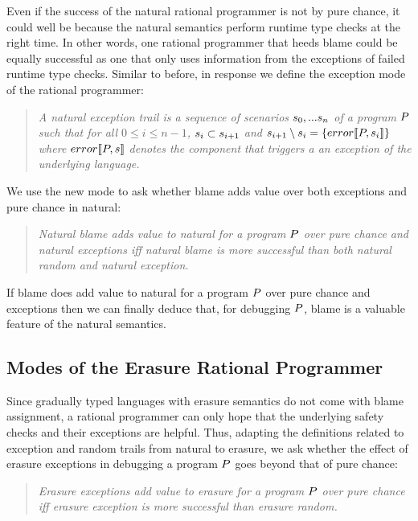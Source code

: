 Even if the success of the natural rational programmer is not by pure
chance, it could well be because the natural semantics perform runtime type checks at
the right time. In other words, one rational programmer that 
heeds blame could be equally successful as one that only uses information from the exceptions of failed 
runtime type checks. Similar to before, in response we
define the exception mode of the rational programmer:
\begin{quote}
\it 
A natural exception trail
is a sequence of scenarios $s_0,...s_n$ of a program
$P$ such that for all $0 \leq i \leq n - 1$, $s_i \subset s_{i+1}$ and
$s_{i+1} \setminus s_i = \{error\llbracket P, s_i\rrbracket\}$
  where $error\llbracket P, s\rrbracket$ denotes the component that triggers a
an exception of the underlying language.
\end{quote}
\noindent
We use the new mode to ask whether blame adds value over both exceptions and pure
chance in natural:
\begin{quote}
\it
  Natural blame adds value to natural for a program $P$ over pure chance and
  natural exceptions iff natural blame is more successful than both natural
  random and natural exception.
\end{quote}
\noindent
If blame does add value to natural for a program $P$ 
over pure chance and exceptions then we can finally
deduce that, for debugging $P$, blame is a valuable feature of the
natural semantics.



\subsection{Modes of the Erasure Rational Programmer} \label{sub:erasure}

 Since gradually typed languages with erasure semantics do not come with
 blame assignment, a rational programmer can only hope that the underlying
 safety checks and their exceptions are helpful.  Thus, adapting the
 definitions related to exception and random trails from natural to
 erasure, we ask whether the effect of erasure exceptions in debugging a
 program $P$ goes beyond that of pure chance: 

\begin{quote}
\it
  Erasure exceptions add value to erasure for a program $P$ over pure chance
  iff erasure exception is more successful than erasure random.
\end{quote}
\noindent


